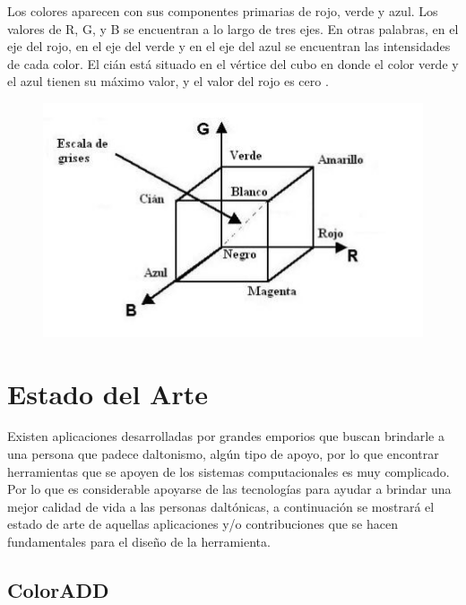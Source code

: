 \documentclass[10pt]{article}
\begin{document}
Los colores aparecen con sus componentes primarias de rojo, verde y azul. Los valores de R, G, y B se encuentran a lo largo de tres ejes. En otras palabras, en el eje del rojo, en el eje del verde y en el eje del azul se encuentran las intensidades de cada color. El cián está situado en el vértice del cubo en donde el color verde y el azul tienen su máximo valor, y el valor del rojo es cero \cite{IEEEreferencias:Ref16}.
\begin{figure}[H]
	\begin{center}
\includegraphics[scale = 0.85]{Imagenes/cubo.JPG}
	\end{center} 
\end{figure}

\cite{IEEEreferencias:Ref2}

\section{Estado del Arte}
Existen aplicaciones desarrolladas por grandes emporios que buscan brindarle a una persona que padece daltonismo, algún tipo de apoyo, por lo que encontrar herramientas que se apoyen de los sistemas computacionales es muy complicado. Por lo que es considerable apoyarse de las tecnologías para ayudar a brindar una mejor calidad de vida a las personas daltónicas, a continuación se mostrará el estado de arte de aquellas aplicaciones y/o contribuciones que se hacen fundamentales para el diseño de la herramienta.

\subsection{ColorADD}
\end{document}
